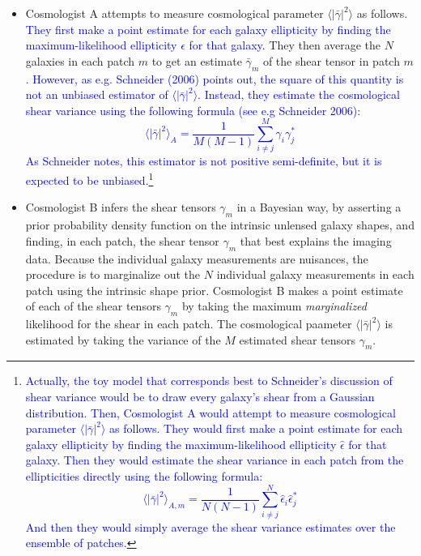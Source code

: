 \documentclass[12pt]{article}
\def\shearvar{\langle |\bar{\gamma}|^2\rangle}
\def\mleps{\hat{\epsilon}}
\def\phil#1{\textcolor{blue}{#1}}
\begin{document}
\begin{itemize}

\item Cosmologist A attempts to measure cosmological parameter $\shearvar$ as
follows. \phil{They first make a point estimate for each galaxy ellipticity 
by finding the maximum-likelihood ellipticity $\mleps$ for that
galaxy.} 
They then average the $N$ galaxies in each
patch $m$ to get an estimate $\bar{\gamma}_m$ 
of the shear tensor in patch $m$. \phil{However, 
as e.g. Schneider (2006) points out, the square of this quantity is not
an unbiased estimator of $\shearvar$. Instead, 
they estimate the cosmological shear variance
using the following formula (see e.g Schneider 2006):
\begin{equation}
  \shearvar_{A} = \frac{1}{M(M-1)}\sum^{M}_{i \neq j} \gamma_i \gamma^{*}_j
\end{equation}
As Schneider notes, this estimator is not positive semi-definite, but it is
expected to be unbiased.}\footnote{\phil{Actually, the toy model that corresponds
best to Schneider's discussion of shear variance would be to 
draw every galaxy's shear from a
Gaussian distribution. Then, Cosmologist A would
attempt to measure cosmological parameter $\shearvar$ as
follows. They would first make a point estimate for each galaxy ellipticity 
by finding the maximum-likelihood ellipticity $\hat{\epsilon}$ for that
galaxy. 
Then they would estimate the shear variance in each patch from the
ellipticities directly
using the following formula:
\begin{equation}
  \shearvar_{A,m} = \frac{1}{N(N-1)}\sum^{N}_{i \neq j} \mleps_i \mleps^{*}_j
\end{equation}
And then they would simply average the shear variance estimates over the
ensemble of patches.}}


\item Cosmologist B infers the shear tensors $\gamma_m$ in a Bayesian way,
by asserting a prior probability density function on the intrinsic
unlensed galaxy shapes, and finding, in each patch, the shear tensor
$\gamma_m$ that best explains the imaging data.  Because the
individual galaxy measurements are nuisances, the procedure is to
marginalize out the $N$ individual galaxy measurements in each patch
using the intrinsic shape prior.  Cosmologist B makes a
point estimate of each of the shear tensors $\gamma_m$ by taking the
maximum \emph{marginalized} likelihood for the shear in each patch.
The cosmological paameter $\shearvar$ is estimated by taking the
variance of the $M$ estimated shear tensors $\gamma_m$.


\end{itemize}
\end{document}
